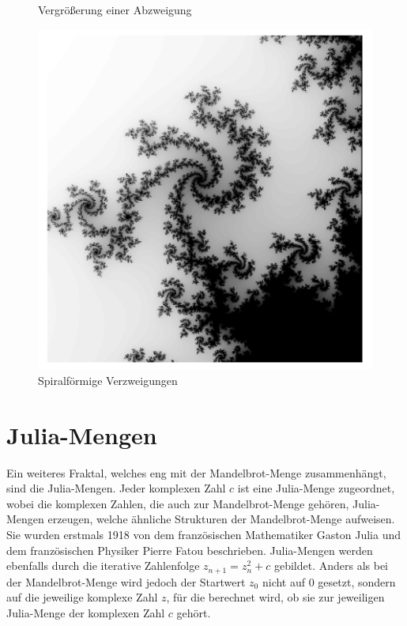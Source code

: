 \begin{figure}[H]
  \caption{\newline Vergrößerung einer \newline Abzweigung}\label{fig:mandelbrot-zoomed}
  \endminipage\hfill
  \includegraphics[width=\linewidth]{img/MandelbrotSpirals.pdf}
  \caption{\newline Spiralförmige \newline Verzweigungen}\label{fig:mandelbrot-spirals}
  \endminipage
\end{figure}

\section{Julia-Mengen}
Ein weiteres Fraktal, welches eng mit der Mandelbrot-Menge zusammenhängt, sind
die Julia-Mengen. Jeder komplexen Zahl $c$ ist eine Julia-Menge zugeordnet,
wobei die komplexen Zahlen, die auch zur Mandelbrot-Menge gehören, Julia-Mengen
erzeugen, welche ähnliche Strukturen der Mandelbrot-Menge aufweisen. \newline
Sie wurden erstmals 1918 von dem französischen Mathematiker Gaston Julia und
dem französischen Physiker Pierre Fatou beschrieben. \hfill \break \newline
Julia-Mengen werden ebenfalls durch die iterative Zahlenfolge $z_{n+1} =
  z_{n}^{2}+ c$ gebildet. Anders als bei der Mandelbrot-Menge wird jedoch der
Startwert $z_{0}$ nicht auf 0 gesetzt, sondern auf die jeweilige komplexe Zahl
$z$, für die berechnet wird, ob sie zur jeweiligen Julia-Menge der komplexen
Zahl $c$ gehört. \newline

